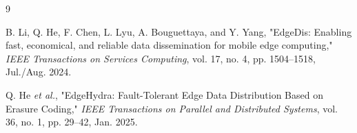 \documentclass[11pt,a4paper]{article}
\begin{document}
\begin{thebibliography}{9}

B. Li, Q. He, F. Chen, L. Lyu, A. Bouguettaya, and Y. Yang, "EdgeDis: Enabling fast, economical, and reliable data dissemination for mobile edge computing," \textit{IEEE Transactions on Services Computing}, vol. 17, no. 4, pp. 1504–1518, Jul./Aug. 2024.

Q. He \textit{et al.}, "EdgeHydra: Fault-Tolerant Edge Data Distribution Based on Erasure Coding," \textit{IEEE Transactions on Parallel and Distributed Systems}, vol. 36, no. 1, pp. 29–42, Jan. 2025.

\end{thebibliography}
\end{document}
